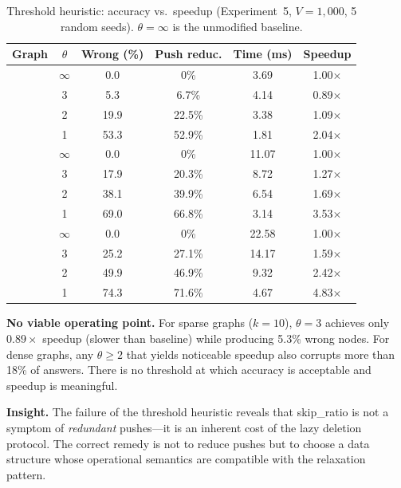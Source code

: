 \documentclass[conference]{IEEEtran}
\begin{document}
\begin{table}[t]
\centering
\caption{Threshold heuristic: accuracy vs.\ speedup (Experiment~5,
$V=1{,}000$, 5 random seeds).
$\theta=\infty$ is the unmodified baseline.}
\label{tab:threshold}
\footnotesize
\setlength{\tabcolsep}{3pt}
\begin{tabular}{cccccc}
\toprule
Graph & $\theta$ & Wrong (\%) & Push reduc. & Time (ms) & Speedup \\
\midrule
{}
 & $\infty$ & 0.0  & 0\%   & 3.69 & 1.00$\times$ \\
 & 3        & 5.3  & 6.7\% & 4.14 & 0.89$\times$ \\
 & 2        & 19.9 & 22.5\%& 3.38 & 1.09$\times$ \\
 & 1        & 53.3 & 52.9\%& 1.81 & 2.04$\times$ \\
\midrule
{}
 & $\infty$ & 0.0  & 0\%   &11.07 & 1.00$\times$ \\
 & 3        & 17.9 & 20.3\%& 8.72 & 1.27$\times$ \\
 & 2        & 38.1 & 39.9\%& 6.54 & 1.69$\times$ \\
 & 1        & 69.0 & 66.8\%& 3.14 & 3.53$\times$ \\
\midrule
{}
 & $\infty$ & 0.0  & 0\%   &22.58 & 1.00$\times$ \\
 & 3        & 25.2 & 27.1\%&14.17 & 1.59$\times$ \\
 & 2        & 49.9 & 46.9\%& 9.32 & 2.42$\times$ \\
 & 1        & 74.3 & 71.6\%& 4.67 & 4.83$\times$ \\
\bottomrule
\end{tabular}
\end{table}

\noindent\textbf{No viable operating point.}
For sparse graphs ($k=10$), $\theta=3$ achieves only $0.89\times$
speedup (slower than baseline) while producing 5.3\% wrong nodes.  For
dense graphs, any $\theta\geq 2$ that yields noticeable speedup also
corrupts more than 18\% of answers.  There is no threshold at which
accuracy is acceptable and speedup is meaningful.

\noindent\textbf{Insight.}  The failure of the threshold heuristic
reveals that skip\_ratio is not a symptom of \emph{redundant} pushes---it
is an inherent cost of the lazy deletion protocol.  The correct remedy
is not to reduce pushes but to choose a data structure whose operational
semantics are compatible with the relaxation pattern.
\end{document}
